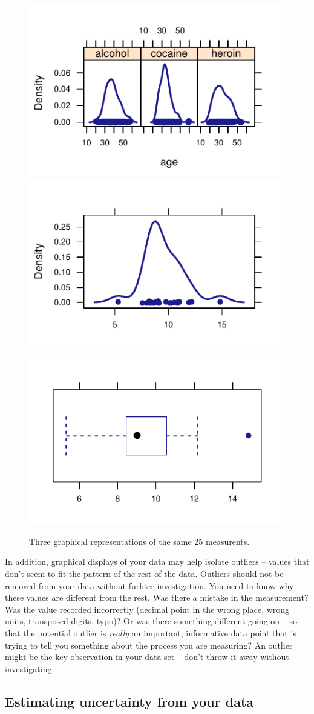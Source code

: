 \documentclass[twoside]{book}\usepackage[]{graphicx}\usepackage[]{xcolor}
\newenvironment{knitrout}{}{} %
\begin{document}
\begin{figure}[h]
\begin{knitrout}
\color{fgcolor}

{\centering \includegraphics[width=.3\textwidth]{figures/fig-unnamed-chunk-122-1} 
\includegraphics[width=.3\textwidth]{figures/fig-unnamed-chunk-122-2} 
\includegraphics[width=.3\textwidth]{figures/fig-unnamed-chunk-122-3} 

}



\end{knitrout}
\caption{Three graphical representations of the same 25 measurents.}
\end{figure}


In addition, graphical displays of your data may help isolate outliers -- values
that don't seem to fit the pattern of the rest of the data.  Outliers should not be removed
from your data without furhter investigation.  You need to know why these values are 
different from the rest.  Was there a mistake in the measurement?  Was the value recorded
incorrectly (decimal point in the wrong place, wrong units, transposed digits, typo)?
Or was there something different going on -- so that the potential outlier is \emph{really} an important, informative data point that is trying to tell you something about the process you are measuring?  An outlier might be the key observation in 
your data set -- don't throw it away without investigating.

\subsection{Estimating uncertainty from your data}
\label{sec:uncertainty-from-data}
\end{document}
